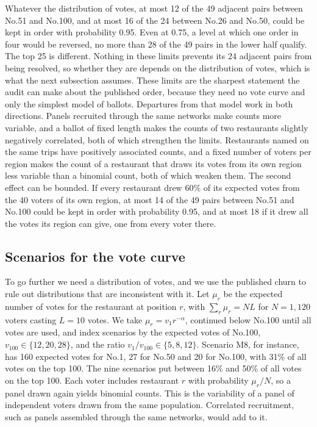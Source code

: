 \documentclass[11pt,a4paper]{article}
\begin{document}
Whatever the distribution of votes, at most 12 of the 49 adjacent pairs between No.51 and No.100, and at most 16 of the 24 between No.26 and No.50, could be kept in order with probability 0.95. Even at 0.75, a level at which one order in four would be reversed, no more than 28 of the 49 pairs in the lower half qualify. The top 25 is different. Nothing in these limits prevents its 24 adjacent pairs from being resolved, so whether they are depends on the distribution of votes, which is what the next subsection assumes. These limits are the sharpest statement the audit can make about the published order, because they need no vote curve and only the simplest model of ballots. Departures from that model work in both directions. Panels recruited through the same networks make counts more variable, and a ballot of fixed length makes the counts of two restaurants slightly negatively correlated, both of which strengthen the limits. Restaurants named on the same trips have positively associated counts, and a fixed number of voters per region makes the count of a restaurant that draws its votes from its own region less variable than a binomial count, both of which weaken them. The second effect can be bounded. If every restaurant drew 60\% of its expected votes from the 40 voters of its own region, at most 14 of the 49 pairs between No.51 and No.100 could be kept in order with probability 0.95, and at most 18 if it drew all the votes its region can give, one from every voter there.

\subsection{Scenarios for the vote curve}\label{sec:scenarios}

To go further we need a distribution of votes, and we use the published churn to rule out distributions that are inconsistent with it. Let $\mu_r$ be the expected number of votes for the restaurant at position $r$, with $\sum_r \mu_r = N L$ for $N = 1{,}120$ voters casting $L = 10$ votes. We take $\mu_r = v_1 r^{-\alpha}$, continued below No.100 until all votes are used, and index scenarios by the expected votes of No.100, $v_{100} \in \{12, 20, 28\}$, and the ratio $v_1 / v_{100} \in \{5, 8, 12\}$. Scenario M8, for instance, has 160 expected votes for No.1, 27 for No.50 and 20 for No.100, with 31\% of all votes on the top 100. The nine scenarios put between 16\% and 50\% of all votes on the top 100. Each voter includes restaurant $r$ with probability $\mu_r/N$, so a panel drawn again yields binomial counts. This is the variability of a panel of independent voters drawn from the same population. Correlated recruitment, such as panels assembled through the same networks, would add to it.
\end{document}
